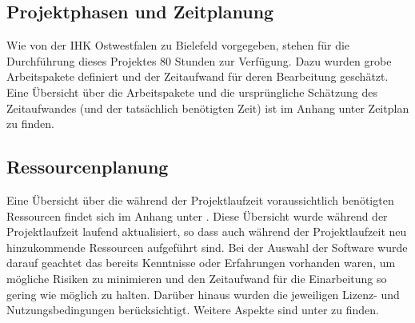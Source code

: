 \subsection{Projektphasen und Zeitplanung}

Wie von der IHK Ostwestfalen zu Bielefeld vorgegeben, stehen für die Durchführung dieses Projektes 80 Stunden zur Verfügung. Dazu wurden grobe Arbeitspakete definiert und der Zeitaufwand für deren Bearbeitung geschätzt. Eine Übersicht über die Arbeitspakete und die ursprüngliche Schätzung des Zeitaufwandes (und der tatsächlich benötigten Zeit) ist im Anhang unter Zeitplan  zu finden.


\subsection{Ressourcenplanung}

Eine Übersicht über die während der Projektlaufzeit voraussichtlich benötigten Ressourcen findet sich im Anhang unter . Diese Übersicht wurde während der Projektlaufzeit laufend aktualisiert, so dass auch während der Projektlaufzeit neu hinzukommende Ressourcen aufgeführt sind.
Bei der Auswahl der Software wurde darauf geachtet das bereits Kenntnisse oder Erfahrungen vorhanden waren, um mögliche Risiken zu minimieren und den Zeitaufwand für die Einarbeitung so gering wie möglich zu halten. Darüber hinaus wurden die jeweiligen Lizenz- und Nutzungsbedingungen berücksichtigt. Weitere Aspekte sind unter  zu finden.
